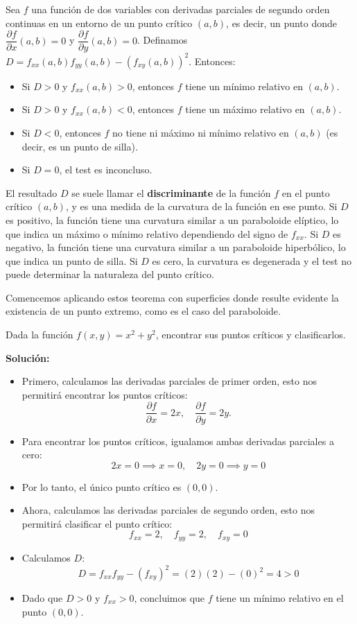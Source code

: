 \begin{teorema}
    Sea $f$ una función de dos variables con derivadas parciales de segundo orden continuas en un entorno de un punto crítico $(a,b)$, es decir, un punto donde $\dfrac{\partial f}{\partial x}(a,b)=0$ y $\dfrac{\partial f}{\partial y}(a,b)=0$. Definamos $D=f_{xx}(a,b)f_{yy}(a,b)-\left(f_{xy}(a,b)\right)^2$. Entonces:
    \begin{itemize}
        \item Si $D>0$ y $f_{xx}(a,b)>0$, entonces $f$ tiene un mínimo relativo en $(a,b)$.
        \item Si $D>0$ y $f_{xx}(a,b)<0$, entonces $f$ tiene un máximo relativo en $(a,b)$.
        \item Si $D<0$, entonces $f$ no tiene ni máximo ni mínimo relativo en $(a,b)$ (es decir, es un punto de silla).
        \item Si $D=0$, el test es inconcluso.
    \end{itemize}
\end{teorema}

El resultado $D$ se suele llamar el \textbf{discriminante} de la función $f$ en el punto crítico $(a,b)$, y es una medida de la curvatura de la función en ese punto. Si $D$ es positivo, la función tiene una curvatura similar a un paraboloide elíptico, lo que indica un máximo o mínimo relativo dependiendo del signo de $f_{xx}$. Si $D$ es negativo, la función tiene una curvatura similar a un paraboloide hiperbólico, lo que indica un punto de silla. Si $D$ es cero, la curvatura es degenerada y el test no puede determinar la naturaleza del punto crítico.

\newpage

Comencemos aplicando estos teorema con superficies donde resulte evidente la existencia de un punto extremo, como es el caso del paraboloide.

\begin{ejemplo}
    Dada la función $f(x,y)=x^2+y^2$, encontrar sus puntos críticos y clasificarlos.
\end{ejemplo}
\textbf{Solución:}
\begin{itemize}
    \item Primero, calculamos las derivadas parciales de primer orden, esto nos permitirá encontrar los puntos críticos:
    \[
\frac{\partial f}{\partial x} = 2x, \quad \frac{\partial f}{\partial y} = 2y.
    \]
    \item Para encontrar los puntos críticos, igualamos ambas derivadas parciales a cero:
    \[
2x = 0 \implies x = 0, \quad 2y = 0 \implies y = 0
    \]
    \item Por lo tanto, el único punto crítico es $(0,0)$.
    \item Ahora, calculamos las derivadas parciales de segundo orden, esto nos permitirá clasificar el punto crítico:
    \[
    f_{xx} = 2, \quad f_{yy} = 2, \quad f_{xy} = 0
    \]
    \item Calculamos $D$:
    \[
    D = f_{xx}f_{yy} - (f_{xy})^2 = (2)(2) - (0)^2 = 4 > 0
    \]
    \item Dado que $D > 0$ y $f_{xx} > 0$, concluimos que $f$ tiene un mínimo relativo en el punto $(0,0)$.
\end{itemize}

